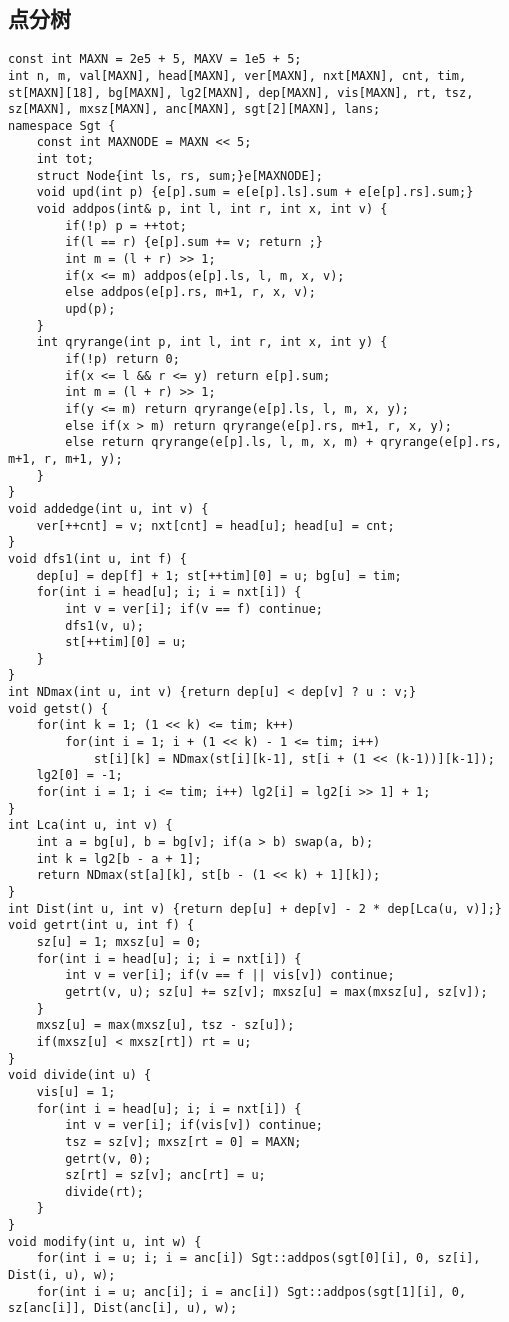 \documentclass{article}
\begin{document}
   \subsection{点分树}
   \begin{lstlisting}
const int MAXN = 2e5 + 5, MAXV = 1e5 + 5;
int n, m, val[MAXN], head[MAXN], ver[MAXN], nxt[MAXN], cnt, tim, st[MAXN][18], bg[MAXN], lg2[MAXN], dep[MAXN], vis[MAXN], rt, tsz, sz[MAXN], mxsz[MAXN], anc[MAXN], sgt[2][MAXN], lans;
namespace Sgt {
	const int MAXNODE = MAXN << 5;
	int tot;
	struct Node{int ls, rs, sum;}e[MAXNODE];
	void upd(int p) {e[p].sum = e[e[p].ls].sum + e[e[p].rs].sum;}
	void addpos(int& p, int l, int r, int x, int v) {
		if(!p) p = ++tot;
		if(l == r) {e[p].sum += v; return ;}
		int m = (l + r) >> 1;
		if(x <= m) addpos(e[p].ls, l, m, x, v);
		else addpos(e[p].rs, m+1, r, x, v);
		upd(p);
	}
	int qryrange(int p, int l, int r, int x, int y) {
		if(!p) return 0;
		if(x <= l && r <= y) return e[p].sum;
		int m = (l + r) >> 1;
		if(y <= m) return qryrange(e[p].ls, l, m, x, y);
		else if(x > m) return qryrange(e[p].rs, m+1, r, x, y);
		else return qryrange(e[p].ls, l, m, x, m) + qryrange(e[p].rs, m+1, r, m+1, y);
	}
}
void addedge(int u, int v) {
	ver[++cnt] = v; nxt[cnt] = head[u]; head[u] = cnt;
}
void dfs1(int u, int f) {
	dep[u] = dep[f] + 1; st[++tim][0] = u; bg[u] = tim;
	for(int i = head[u]; i; i = nxt[i]) {
		int v = ver[i]; if(v == f) continue;
		dfs1(v, u);
		st[++tim][0] = u;
	}
}
int NDmax(int u, int v) {return dep[u] < dep[v] ? u : v;}
void getst() {
	for(int k = 1; (1 << k) <= tim; k++)
		for(int i = 1; i + (1 << k) - 1 <= tim; i++)
			st[i][k] = NDmax(st[i][k-1], st[i + (1 << (k-1))][k-1]);
	lg2[0] = -1;
	for(int i = 1; i <= tim; i++) lg2[i] = lg2[i >> 1] + 1;
}
int Lca(int u, int v) {
	int a = bg[u], b = bg[v]; if(a > b) swap(a, b);
	int k = lg2[b - a + 1];
	return NDmax(st[a][k], st[b - (1 << k) + 1][k]);
}
int Dist(int u, int v) {return dep[u] + dep[v] - 2 * dep[Lca(u, v)];}
void getrt(int u, int f) {
	sz[u] = 1; mxsz[u] = 0;
	for(int i = head[u]; i; i = nxt[i]) {
		int v = ver[i]; if(v == f || vis[v]) continue;
		getrt(v, u); sz[u] += sz[v]; mxsz[u] = max(mxsz[u], sz[v]);
	}
	mxsz[u] = max(mxsz[u], tsz - sz[u]);
	if(mxsz[u] < mxsz[rt]) rt = u;
}
void divide(int u) {
	vis[u] = 1; 
	for(int i = head[u]; i; i = nxt[i]) {
		int v = ver[i]; if(vis[v]) continue;
		tsz = sz[v]; mxsz[rt = 0] = MAXN;
		getrt(v, 0);
		sz[rt] = sz[v]; anc[rt] = u;
		divide(rt);
	}
}
void modify(int u, int w) {
	for(int i = u; i; i = anc[i]) Sgt::addpos(sgt[0][i], 0, sz[i], Dist(i, u), w);
	for(int i = u; anc[i]; i = anc[i]) Sgt::addpos(sgt[1][i], 0, sz[anc[i]], Dist(anc[i], u), w);

\end{lstlisting}
\end{document}
